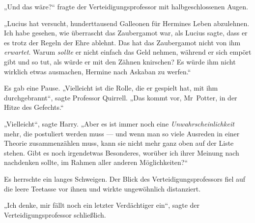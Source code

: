 „Und das wäre?“ fragte der Verteidigungsprofessor mit halbgeschlossenen Augen.

„Lucius hat versucht, hunderttausend Galleonen für Hermines Leben abzulehnen. Ich habe gesehen, wie überrascht das Zaubergamot war, als Lucius sagte, dass er es trotz der Regeln der Ehre ablehnt. Das hat das Zaubergamot nicht von ihm \emph{erwartet}. Warum \emph{sollte} er nicht einfach das Geld nehmen, während er sich empört gibt und so tut, als würde er mit den Zähnen knirschen? Es würde ihm nicht wirklich etwas ausmachen, Hermine nach Askaban zu werfen.“

Es gab eine Pause.
„Vielleicht ist die Rolle, die er gespielt hat, mit ihm durchgebrannt“, sagte Professor Quirrell.
„Das kommt vor, Mr~Potter, in der Hitze des Gefechts.“

„Vielleicht“, sagte Harry.
„Aber es ist immer noch eine \emph{Unwahrscheinlichkeit} mehr, die postuliert werden muss — und wenn man so viele Ausreden in einer Theorie zusammenzählen muss, kann sie nicht mehr ganz oben auf der Liste stehen. Gibt es noch irgendetwas Besonderes, worüber ich ihrer Meinung nach nachdenken sollte, im Rahmen aller anderen Möglichkeiten?“

Es herrschte ein langes Schweigen.
Der Blick des Verteidigungsprofessors fiel auf die leere Teetasse vor ihnen und wirkte ungewöhnlich distanziert.

„Ich denke, mir fällt noch ein letzter Verdächtiger ein“, sagte der Verteidigungsprofessor schließlich.

